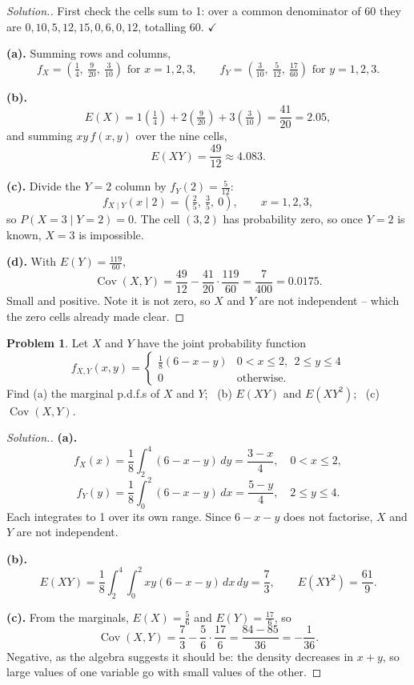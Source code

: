 \documentclass[12pt,a4paper]{report}
\theoremstyle{definition}
\theoremstyle{plain}
\theoremstyle{definition}
\newtheorem{problemx}{Problem}[section]
\newenvironment{problem}{\begin{problemx}}{\end{problemx}}
\newenvironment{solution}
  {\renewcommand{\qedsymbol}{}\begin{proof}[\textit{Solution}.]}
  {\end{proof}}
\let\amscheckmark\checkmark
\renewcommand{\checkmark}{\ensuremath{\amscheckmark}}
\begin{document}
\begin{solution}
First check the cells sum to 1: over a common denominator of 60 they are
$0,10,5,12,15,0,6,0,12$, totalling $60$. \checkmark

\textbf{(a).} Summing rows and columns,
\[f_X = \left(\tfrac{1}{4},\ \tfrac{9}{20},\ \tfrac{3}{10}\right) \text{ for } x=1,2,3,
\qquad
f_Y = \left(\tfrac{3}{10},\ \tfrac{5}{12},\ \tfrac{17}{60}\right) \text{ for } y=1,2,3.\]

\textbf{(b).}
\[E(X) = 1\left(\tfrac14\right)+2\left(\tfrac{9}{20}\right)+3\left(\tfrac{3}{10}\right)
 = \frac{41}{20} = 2.05,\]
and summing $xy\,f(x,y)$ over the nine cells,
\[E(XY) = \frac{49}{12} \approx 4.083.\]

\textbf{(c).} Divide the $Y=2$ column by $f_Y(2) = \tfrac{5}{12}$:
\[f_{X\mid Y}(x\mid 2) = \left(\tfrac{2}{5},\ \tfrac{3}{5},\ 0\right),
\qquad x = 1,2,3,\]
so $P(X=3\mid Y=2) = 0$. The cell $(3,2)$ has probability zero, so once $Y=2$ is known,
$X=3$ is impossible.

\textbf{(d).} With $E(Y) = \tfrac{119}{60}$,
\[\operatorname{Cov}(X,Y) = \frac{49}{12}-\frac{41}{20}\cdot\frac{119}{60}
 = \frac{7}{400} = 0.0175.\]
Small and positive. Note it is not zero, so $X$ and $Y$ are not independent -- which the
zero cells already made clear.
\end{solution}

\begin{problem}
Let $X$ and $Y$ have the joint probability function
\[f_{X,Y}(x,y) = \begin{cases}\frac{1}{8}(6-x-y) & 0<x\leq 2,\ \ 2\leq y\leq 4\\
0 & \text{otherwise.}\end{cases}\]
Find (a) the marginal p.d.f.s of $X$ and $Y$; \, (b) $E(XY)$ and $E(XY^{2})$; \,
(c) $\operatorname{Cov}(X,Y)$.
\end{problem}

\begin{solution}
\textbf{(a).}
\[f_X(x) = \frac{1}{8}\int_2^4 (6-x-y)\,dy = \frac{3-x}{4},\quad 0<x\leq 2,\]
\[f_Y(y) = \frac{1}{8}\int_0^2 (6-x-y)\,dx = \frac{5-y}{4},\quad 2\leq y\leq 4.\]
Each integrates to 1 over its own range. Since $6-x-y$ does not factorise, $X$ and $Y$ are
not independent.

\textbf{(b).}
\[E(XY) = \frac{1}{8}\int_2^4\!\!\int_0^2 xy(6-x-y)\,dx\,dy = \frac{7}{3},\qquad
E(XY^{2}) = \frac{61}{9}.\]

\textbf{(c).} From the marginals, $E(X) = \tfrac56$ and $E(Y) = \tfrac{17}{6}$, so
\[\operatorname{Cov}(X,Y) = \frac{7}{3}-\frac{5}{6}\cdot\frac{17}{6}
 = \frac{84-85}{36} = -\frac{1}{36}.\]
Negative, as the algebra suggests it should be: the density decreases in $x+y$, so large
values of one variable go with small values of the other.
\end{solution}
\end{document}
